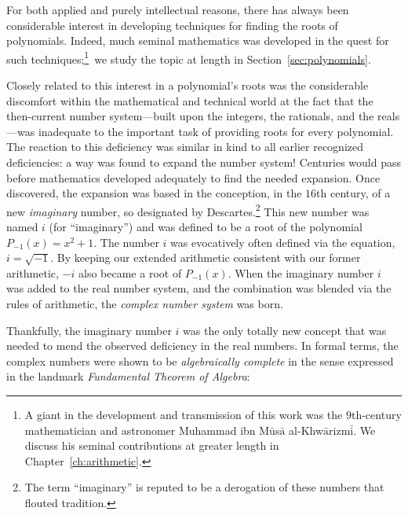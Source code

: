 \medskip


For both applied and purely intellectual reasons, there has always been considerable interest in developing techniques for finding the roots of polynomials.  Indeed, much seminal mathematics was developed in the quest for such techniques;\footnote{A giant in the development and transmission of this work was the $9$th-century mathematician and astronomer Muhammad ibn M$\bar{\mbox{u}}$s$\bar{\mbox{a}}$ al-Khw$\bar{\mbox{a}}$rizm$\bar{\mbox{i}}$.  We discuss his seminal contributions at greater length in Chapter~\ref{ch:arithmetic}.}~we study the topic at length in Section~\ref{sec:polynomials}.

\smallskip

  

Closely related to this interest in a polynomial's roots was the considerable discomfort within the mathematical and technical world at the fact that the then-current number system---built upon the integers, the rationals, and the reals---was inadequate to the important task of providing roots for every polynomial.  The reaction to this deficiency was similar in kind to all earlier recognized deficiencies: a way was found to expand the number system!  Centuries would pass before mathematics developed adequately to find the needed expansion.  Once discovered, the expansion was based in the conception, in the $16$th century, of a new {\it imaginary} number, so designated by Descartes.\footnote{The term ``imaginary'' is reputed to be a derogation of these numbers that flouted tradition.}  This new number was named $i$ (for ``imaginary'') and was defined to be a root of the polynomial $P_{-1}(x) = x^2 +1$.  The number $i$ was evocatively often defined via the equation, $i = \sqrt{-1}$.  By keeping our extended arithmetic consistent with our former arithmetic, $-i$ also became a root of $P_{-1}(x)$.  When the imaginary number $i$ was added to the real number system, and the combination was blended
via the rules of arithmetic, the {\it complex number system} was born.

\smallskip

 
Thankfully, the imaginary number $i$ was the only totally new concept that was needed to mend the observed deficiency in the real numbers.  In formal terms, the complex numbers were shown to be {\it algebraically complete} in the sense expressed in the landmark {\it Fundamental Theorem of Algebra}:

